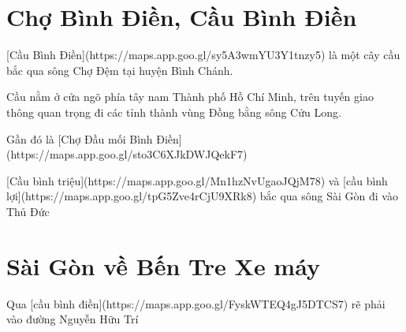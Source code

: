 \section{Chợ Bình Điền, Cầu Bình Điền}

[Cầu Bình Điền](https://maps.app.goo.gl/sy5A3wmYU3Y1tnzy5) là một cây cầu bắc qua sông Chợ Đệm tại huyện Bình Chánh.

Cầu nằm ở cửa ngõ phía tây nam Thành phố Hồ Chí Minh, trên tuyến giao thông quan trọng đi các tỉnh thành vùng Đồng bằng sông Cửu Long.

Gần đó là [Chợ Đầu mối Bình Điền](https://maps.app.goo.gl/sto3C6XJkDWJQekF7)

[Cầu bình triệu](https://maps.app.goo.gl/Mn1hzNvUgaoJQjM78) và [cầu bình lợi](https://maps.app.goo.gl/tpG5Zve4rCjU9XRk8) bắc qua sông Sài Gòn đi vào Thủ Đức

\section{Sài Gòn về Bến Tre Xe máy}

Qua [cầu bình điền](https://maps.app.goo.gl/FyskWTEQ4gJ5DTCS7) rẽ phải vào đường Nguyễn Hữu Trí
